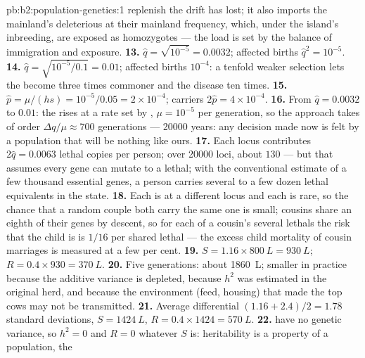 \begin{solution}{pb:b2:population-genetics:1}
replenish the  drift has lost; it also imports the
mainland's deleterious  at their mainland frequency, which,
under the island's inbreeding, are exposed as homozygotes --- the
load is set by the balance of immigration and exposure.
\textbf{13.} $\hat q = \sqrt{10^{-5}} = 0.0032$; affected births $\hat
q^{2} = 10^{-5}$.
\textbf{14.} $\hat q = \sqrt{10^{-5}/0.1} = 0.01$; affected births
$10^{-4}$: a tenfold weaker selection lets the  become three
times commoner and the disease ten times.
\textbf{15.} $\hat p = \mu/(hs) = 10^{-5}/0.05 = 2\times 10^{-4}$;
carriers $2\hat p = 4\times 10^{-4}$.
\textbf{16.} From $\hat q = 0.0032$ to $0.01$: the  rises at a
rate set by , $\mu = 10^{-5}$ per generation, so the
approach takes of order $\Delta q/\mu \approx 700$ generations ---
\num{20000} years: any decision made now is felt by a population
that will be nothing like ours.
\textbf{17.} Each locus contributes $2\hat q = 0.0063$ lethal copies
per person; over \num{20000} loci, about $130$ --- but that assumes
every gene can mutate to a  lethal; with the conventional
estimate of a few thousand essential genes, a person carries
several to a few dozen lethal equivalents in the  state.
\textbf{18.} Each is at a different locus and each is rare, so the
chance that a random couple both carry the same one is small;
cousins share an eighth of their genes by descent, so for each of a
cousin's several lethals the risk that the child is  is
$1/16$ per shared lethal --- the excess child mortality of cousin
marriages is measured at a few per cent.
\textbf{19.} $S = 1.16\times \qty{800}{L} = \qty{930}{L}$; $R = 0.4\times
930 = \qty{370}{L}$.
\textbf{20.} Five generations: about \qty{1860}{L}; smaller in
practice because the additive variance is depleted, because $h^{2}$
was estimated in the original herd, and because the environment
(feed, housing) that made the top cows may not be transmitted.
\textbf{21.} Average differential $(1.16 + 2.4)/2 = 1.78$ standard
deviations, $S = \qty{1424}{L}$, $R = 0.4\times 1424 = \qty{570}{L}$.
\textbf{22.}  have no genetic variance, so $h^{2} = 0$ and $R =
0$ whatever $S$ is: heritability is a property of a population, the

\end{solution}
